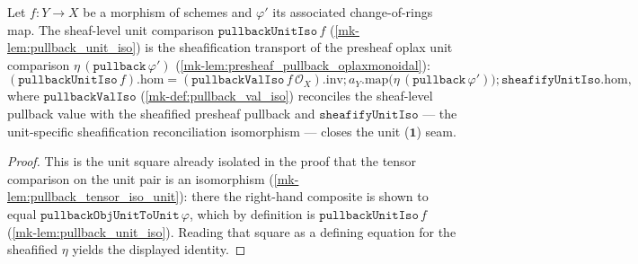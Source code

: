 \begin{lemma}\label{mk-lem:pullback_unit_iso_eq_sheafify_eta}
  \leanok

  Let \(f : Y \to X\) be a morphism of schemes and \(\varphi'\) its associated change-of-rings map.
  The sheaf-level unit comparison \(\mathtt{pullbackUnitIso}\,f\) (\ref{mk-lem:pullback_unit_iso}) is the
  sheafification transport of the presheaf oplax unit comparison
  \(\eta\,(\mathtt{pullback}\,\varphi')\) (\ref{mk-lem:presheaf_pullback_oplaxmonoidal}):
  \[
    (\mathtt{pullbackUnitIso}\,f).\mathrm{hom}
      = (\mathtt{pullbackValIso}\,f\,\mathcal{O}_X).\mathrm{inv}
        \mathbin{;} a_Y.\mathrm{map}\bigl(\eta\,(\mathtt{pullback}\,\varphi')\bigr)
        \mathbin{;} \mathtt{sheafifyUnitIso}.\mathrm{hom},
  \]
  where \(\mathtt{pullbackValIso}\) (\ref{mk-def:pullback_val_iso}) reconciles the sheaf-level pullback
  value with the sheafified presheaf pullback and \(\mathtt{sheafifyUnitIso}\) --- the unit-specific
  sheafification reconciliation isomorphism --- closes the unit (\(\mathbf 1\)) seam.
\end{lemma}
\begin{proof}
  \leanok
  This is the unit square already isolated in the proof that the tensor comparison on the unit pair is
  an isomorphism (\ref{mk-lem:pullback_tensor_iso_unit}): there the right-hand composite is shown to
  equal \(\mathtt{pullbackObjUnitToUnit}\,\varphi\), which by definition is
  \(\mathtt{pullbackUnitIso}\,f\) (\ref{mk-lem:pullback_unit_iso}). Reading that square as a defining
  equation for the sheafified \(\eta\) yields the displayed identity.
\end{proof}

